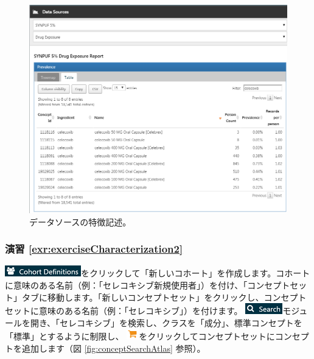 \documentclass[
  11pt]{book}
\theoremstyle{definition}
\theoremstyle{definition}
\theoremstyle{definition}
\theoremstyle{definition}
\theoremstyle{remark}
\begin{document}
\begin{figure}

{\centering \includegraphics[width=1\linewidth]{images/SuggestedAnswers/dataSourcesAtlas} 

}

\caption{データソースの特徴記述。}\label{fig:dataSourcesAtlas}
\end{figure}

\subsubsection*{演習 \ref{exr:exerciseCharacterization2}}\label{ux6f14ux7fd2-refexrexercisecharacterization2}

\includegraphics{images/Cohorts/cohortdefinition.png}をクリックして「新しいコホート」を作成します。コホートに意味のある名前（例：「セレコキシブ新規使用者」）を付け、「コンセプトセット」タブに移動します。「新しいコンセプトセット」をクリックし、コンセプトセットに意味のある名前（例：「セレコキシブ」）を付けます。 \includegraphics{images/Cohorts/search-2.png}モジュールを開き、「セレコキシブ」を検索し、クラスを「成分」、標準コンセプトを「標準」とするように制限し、 \includegraphics{images/Cohorts/shoppingcart.png}をクリックしてコンセプトセットにコンセプトを追加します（図 \ref{fig:conceptSearchAtlas} 参照）。
\end{document}
